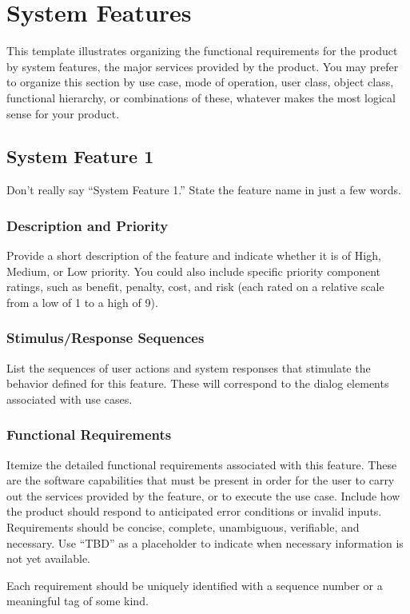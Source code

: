 \section{System Features}
This template illustrates organizing the functional requirements for the product by system features, the major services provided by the product. You may prefer to organize this section by use case, mode of operation, user class, object class, functional hierarchy, or combinations of these, whatever makes the most logical sense for your product.

\subsection{System Feature 1}
Don’t really say “System Feature 1.” State the feature name in just a few words.

\subsubsection{Description and Priority}
Provide a short description of the feature and indicate whether it is of High, Medium, or Low priority. You could also include specific priority component ratings, such as benefit, penalty, cost, and risk (each rated on a relative scale from a low of 1 to a high of 9).

\subsubsection{Stimulus/Response Sequences}
List the sequences of user actions and system responses that stimulate the behavior defined for this feature. These will correspond to the dialog elements associated with use cases.

\subsubsection{Functional Requirements}
Itemize the detailed functional requirements associated with this feature. These are the software capabilities that must be present in order for the user to carry out the services provided by the feature, or to execute the use case. Include how the product should respond to anticipated error conditions or invalid inputs. Requirements should be concise, complete, unambiguous, verifiable, and necessary. Use “TBD” as a placeholder to indicate when necessary information is not yet available.

Each requirement should be uniquely identified with a sequence number or a meaningful tag of some kind.
	
